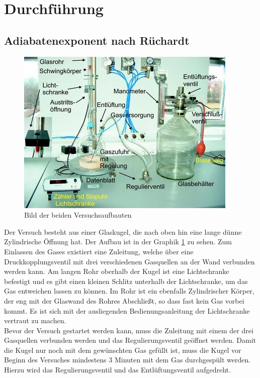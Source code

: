 \documentclass[12pt,a4paper,titlepage,headinclude,bibtotoc]{scrartcl}
\begin{document}
\section{Durchführung}
\label{sec:durchfuehrung}

\subsection{Adiabatenexponent nach Rüchardt}
\begin{figure}
	\centering
	\includegraphics{3725}
	\caption{Bild der beiden Versuchsaufbauten\protect\footnotemark}\label{fig:versuch}
\end{figure}
Der Versuch besteht aus einer Glaskugel, die nach oben hin eine lange dünne Zylindrische Öffnung hat.
Der Aufbau ist in der Graphik \ref{fig:versuch}
zu sehen.
Zum Einlassen des Gases existiert eine Zuleitung, welche über eine Druckkopplungsventil mit drei verschiedenen Gasquellen an der Wand verbunden werden kann.
Am langen Rohr oberhalb der Kugel ist eine Lichtschranke befestigt und es gibt einen kleinen Schlitz unterhalb der Lichtschranke, um das Gas entweichen lassen zu können.
Im Rohr ist ein ebenfalls Zylindrischer Körper, der eng mit der Glaswand des Rohres Abschließt, so dass fast kein Gas vorbei kommt.
Es ist sich mit der ausliegenden Bedienungsanleitung der Lichtschranke vertraut zu machen.\\
Bevor der Versuch gestartet werden kann, muss die Zuleitung mit einem der drei Gasquellen verbunden werden und das Regulierungsventil geöffnet werden.
Damit die Kugel nur noch mit dem gewünschten Gas gefüllt ist, muss die Kugel vor Beginn des Versuches mindestens 3 Minuten mit dem Gas durchgespült werden.
Hierzu wird das Regulierungsventil und das Entlüftungsventil aufgedreht.\\
\end{document}
